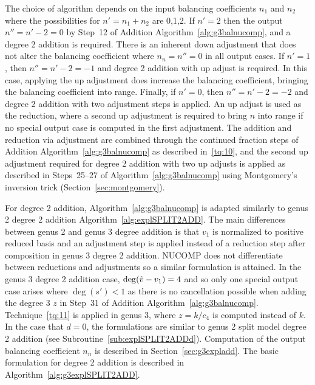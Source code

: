 The choice of algorithm depends on the input balancing coefficients $n_1$ and
$n_2$ where the possibilities for $n' =n_1 + n_2$ are 0,1,2. If $n' = 2$ then
the output $n'' = n'-2 = 0$ by Step~12 of Addition
Algorithm~\ref{alg:g3balnucomp}, and a degree 2 addition is required. There is
an inherent down adjustment that does not alter the balancing coefficient where
$n_n = n'' = 0$ in all output cases. If $n'=1$, then $n'' = n' - 2= -1$ and
degree 2 addition with up adjust is required. In this case, applying the up
adjustment does increase the balancing coefficient, bringing the balancing
coefficient into range. Finally, if $n' = 0$, then $n'' = n' - 2 = -2$ and degree 2
addition with two adjustment steps is applied. An up adjust is used as the
reduction, where a second up adjustment is required to bring $n$ into
range if no special output case is computed in the first adjustment. The addition and reduction via
adjustment are combined through the continued fraction steps of Addition
Algorithm~\ref{alg:g3balnucomp} as described in~\ref{tq:10}, and the second up
adjustment required for degree 2 addition with two up adjusts is applied as
described in Steps~25--27 of Algorithm~\ref{alg:g3balnucomp} using Montgomery's
inversion trick (Section~\ref{sec:montgomery}). 

For degree 2 addition, Algorithm~\ref{alg:g3balnucomp} is adapted  similarly to
genus 2 degree 2 addition Algorithm~\ref{alg:explSPLIT2ADD}.  The main
differences between genus 2 and genus 3 degree addition is that $v_1$ is
normalized to positive reduced basis and an adjustment step is applied instead
of a reduction step after composition in genus 3 degree 2 addition. NUCOMP does
not differentiate between reductions and adjustments so a similar formulation is
attained. In the genus 3 degree 2 addition case, $\deg(\tilde{v} - v_1) = 4$ and so
only one special output case arises where $\deg(s') <1$ as there is no
cancellation possible when adding the degree 3 $z$ in Step~31 of Addition
Algorithm~\ref{alg:g3balnucomp}. Technique~\ref{tq:11} is applied in genus 3,
where $z = k/c_4$ is computed instead of $k$. In the case that $d=0$, the
formulations are similar to genus 2 split model degree 2 addition (see
Subroutine~\ref{sub:explSPLIT2ADDd}). Computation of the output balancing
coefficient $n_n$ is described in Section~\ref{sec:g3expladd}. The basic
formulation for degree 2 addition is described in
Algorithm~\ref{alg:g3explSPLIT2ADD}.


